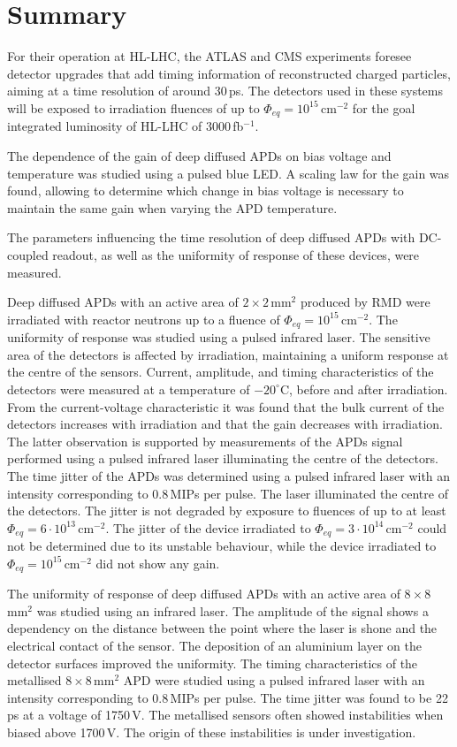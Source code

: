 \documentclass[review,number,sort&compress]{elsarticle}
\begin{document}
\section{Summary}
\label{sec:summary}

For their operation at HL-LHC, the ATLAS and CMS experiments foresee detector upgrades that add timing information of reconstructed charged particles, aiming at a time resolution of around 30\,ps.
The detectors used in these systems will be exposed to irradiation fluences of up to $\Phi_{eq} = 10^{15}$\,cm$^{-2}$ for the goal integrated luminosity of HL-LHC of 3000\,fb$^{-1}$.

The dependence of the gain of deep diffused APDs on bias voltage and temperature was studied using a pulsed blue LED.
A scaling law for the gain was found, allowing to determine which change in bias voltage is necessary to maintain the same gain when varying the APD temperature.

The parameters influencing the time resolution of deep diffused APDs with DC-coupled readout, as well as the uniformity of response of these devices, were measured.

Deep diffused APDs with an active area of $2 \times 2$\,mm$^2$ produced by RMD were irradiated with reactor neutrons up to a fluence of $\Phi_{eq} = 10^{15}$\,cm$^{-2}$.
The uniformity of response was studied using a pulsed infrared laser.
The sensitive area of the detectors is affected by irradiation, maintaining a uniform response at the centre of the sensors.
Current, amplitude, and timing characteristics of the detectors were measured at a temperature of $-20^\circ$C, before and after irradiation.
From the current-voltage characteristic it was found that the bulk current of the detectors increases with irradiation and that the gain decreases with irradiation.
The latter observation is supported by measurements of the APDs signal performed using a pulsed infrared laser illuminating the centre of the detectors.
The time jitter of the APDs was determined using a pulsed infrared laser with an intensity corresponding to 0.8\,MIPs per pulse.
The laser illuminated the centre of the detectors.
The jitter is not degraded by exposure to fluences of up to at least $\Phi_{eq} = 6 \cdot 10^{13}$\,cm$^{-2}$.
The jitter of the device irradiated to $\Phi_{eq} = 3 \cdot 10^{14}$\,cm$^{-2}$ could not be determined due to its unstable behaviour, while the device irradiated to $\Phi_{eq} = 10^{15}$\,cm$^{-2}$ did not show any gain.

The uniformity of response of deep diffused APDs with an active area of $8 \times 8$\,mm$^2$ was studied using an infrared laser.
The amplitude of the signal shows a dependency on the distance between the point where the laser is shone and the electrical contact of the sensor.
The deposition of an aluminium layer on the detector surfaces improved the uniformity.
The timing characteristics of the metallised $8 \times 8$\,mm$^2$ APD were studied using a pulsed infrared laser with an intensity corresponding to 0.8\,MIPs per pulse.
The time jitter was found to be 22\,ps at a voltage of 1750\,V.
The metallised sensors often showed instabilities when biased above 1700\,V.
The origin of these instabilities is under investigation.
\end{document}

